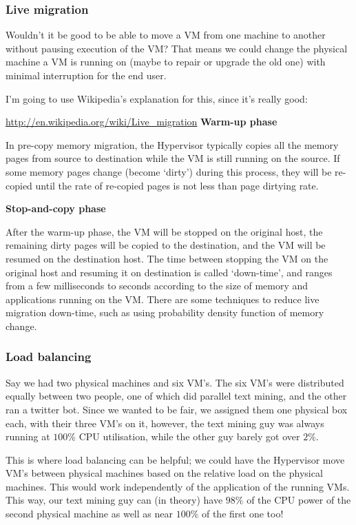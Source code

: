 \subsubsection{Live migration}

Wouldn't it be good to be able to move a VM from one machine to another without
pausing execution of the VM? That means we could change the physical machine a
VM is running on (maybe to repair or upgrade the old one) with minimal
interruption for the end user.

I'm going to use Wikipedia's explanation for this, since it's really good:

\begin{aquote}{\url{http://en.wikipedia.org/wiki/Live_migration}}
  \textbf{Warm-up phase}
  
  In pre-copy memory migration, the Hypervisor typically copies all the memory
  pages from source to destination while the VM is still running on the source.
  If some memory pages change (become `dirty') during this process, they will be
  re-copied until the rate of re-copied pages is not less than page dirtying
  rate.

  \textbf{Stop-and-copy phase}

  After the warm-up phase, the VM will be stopped on the original host, the
  remaining dirty pages will be copied to the destination, and the VM will be
  resumed on the destination host. The time between stopping the VM on the
  original host and resuming it on destination is called `down-time', and ranges
  from a few milliseconds to seconds according to the size of memory and
  applications running on the VM. There are some techniques to reduce live
  migration down-time, such as using probability density function of memory
  change.
\end{aquote}

\subsubsection{Load balancing}

Say we had two physical machines and six VM's. The six VM's were distributed
equally between two people, one of which did parallel text mining, and the other
ran a twitter bot. Since we wanted to be fair, we assigned them one physical box
each, with their three VM's on it, however, the text mining guy was always
running at $100\%$ CPU utilisation, while the other guy barely got over $2\%$.

This is where load balancing can be helpful; we could have the Hypervisor move
VM's between physical machines based on the relative load on the physical
machines. This would work independently of the application of the running VMs.
This way, our text mining guy can (in theory) have $98\%$ of the CPU power of
the second physical machine as well as near $100\%$ of the first one too!

